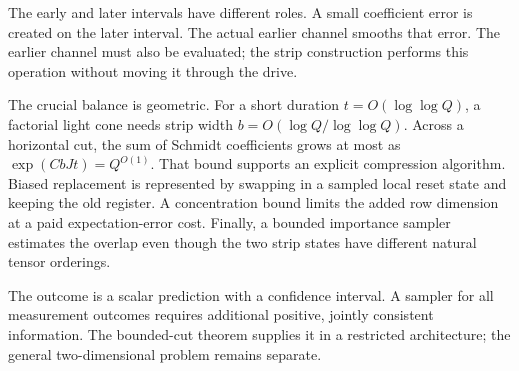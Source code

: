 \documentclass[11pt,reqno]{amsart}
\numberwithin{equation}{section}
\theoremstyle{definition}
\theoremstyle{remark}
\begin{document}
\begin{center}
\end{center}

The early and later intervals have different roles. A small coefficient error is created on the later interval. The actual earlier channel smooths that error. The earlier channel must also be evaluated; the strip construction performs this operation without moving it through the drive.

The crucial balance is geometric. For a short duration $t=O(\log\log Q)$, a factorial light cone needs strip width $b=O(\log Q/\log\log Q)$. Across a horizontal cut, the sum of Schmidt coefficients grows at most as $\exp(CbJt)=Q^{O(1)}$. That bound supports an explicit compression algorithm. Biased replacement is represented by swapping in a sampled local reset state and keeping the old register. A concentration bound limits the added row dimension at a paid expectation-error cost. Finally, a bounded importance sampler estimates the overlap even though the two strip states have different natural tensor orderings.

The outcome is a scalar prediction with a confidence interval. A sampler for all measurement outcomes requires additional positive, jointly consistent information. The bounded-cut theorem supplies it in a restricted architecture; the general two-dimensional problem remains separate.
\end{document}
